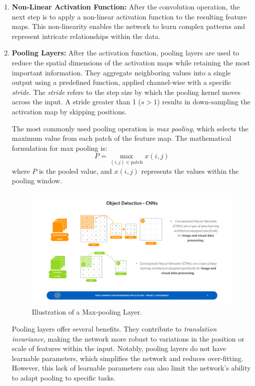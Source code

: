 \begin{enumerate}
    \item \textbf{Non-Linear Activation Function:} After the convolution operation, the next step is to apply a non-linear activation function to the resulting feature maps. This non-linearity enables the network to learn complex patterns and represent intricate relationships within the data. 

    \item \textbf{Pooling Layers:} After the activation function, pooling layers are used to reduce the spatial dimensions of the activation maps while retaining the most important information. They aggregate neighboring values into a single output using a predefined function, applied channel-wise with a specific \textit{stride}. The \textit{stride} refers to the step size by which the pooling kernel moves across the input. A stride greater than 1 (\( s > 1 \)) results in down-sampling the activation map by skipping positions.
    
    The most commonly used pooling operation is \textit{max pooling}, which selects the maximum value from each patch of the feature map. The mathematical formulation for max pooling is:
    \begin{equation}
        P = \max_{(i,j) \in \text{patch}} x(i,j)
    \end{equation}
    where \( P \) is the pooled value, and \( x(i,j) \) represents the values within the pooling window.
    
    \begin{figure}[H]
        \centering
        \includegraphics[width=0.85\linewidth]{LateX//figs/CNN_poolinh.pdf}
        \caption{Illustration of a Max-pooling Layer.}
        \label{fig:cnn-pooling}
    \end{figure}
    
    Pooling layers offer several benefits. They contribute to \textit{translation invariance}, making the network more robust to variations in the position or scale of features within the input. Notably, pooling layers do not have learnable parameters, which simplifies the network and reduces over-fitting. However, this lack of learnable parameters can also limit the network's ability to adapt pooling to specific tasks. 


\end{enumerate}
